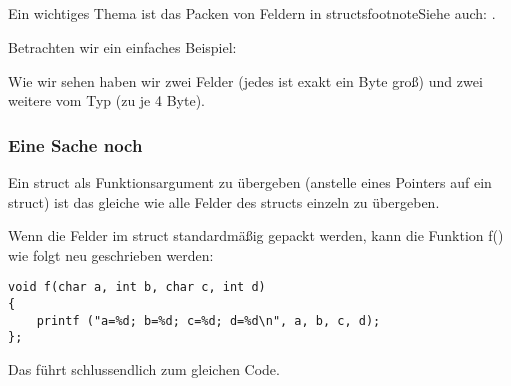 \subsection{\StructurePackingSectionName}
\label{structure_packing}
Ein wichtiges Thema ist das Packen von Feldern in structsfootnote{Siehe auch: \URLWPDA}.

Betrachten wir ein einfaches Beispiel:


Wie wir sehen haben wir zwei \Tchar Felder (jedes ist exakt ein Byte groß) und zwei weitere vom Typ \Tint (zu je 4
Byte).





\subsubsection{Eine Sache noch}
Ein struct als Funktionsargument zu übergeben (anstelle eines Pointers auf ein struct) ist das gleiche wie alle Felder
des structs einzeln zu übergeben.

Wenn die Felder im struct standardmäßig gepackt werden, kann die Funktion f() wie folgt neu geschrieben werden:

\begin{lstlisting}[style=customc]
void f(char a, int b, char c, int d)
{
    printf ("a=%d; b=%d; c=%d; d=%d\n", a, b, c, d);
};
\end{lstlisting}
Das führt schlussendlich zum gleichen Code.
